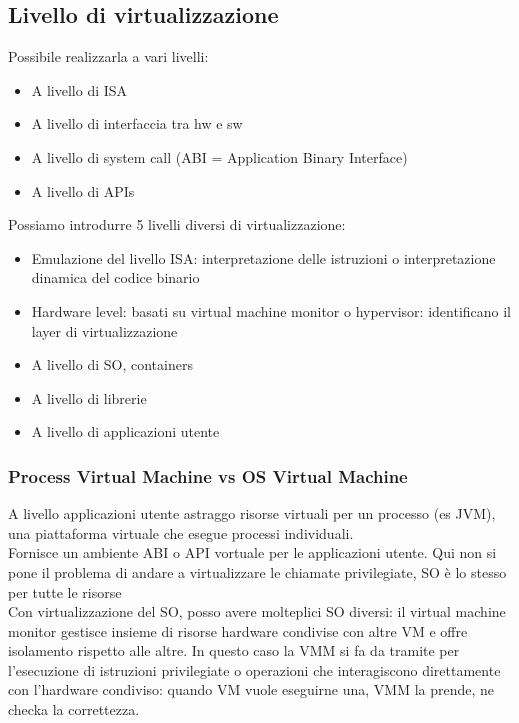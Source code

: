 \documentclass[16px]{article}
\begin{document}
\subsection{Livello di virtualizzazione}
Possibile realizzarla a vari livelli:
\begin{itemize}
\item A livello di ISA
\item A livello di interfaccia tra hw e sw
\item A livello di system call (ABI = Application Binary Interface)
\item A livello di APIs
\end{itemize}
Possiamo introdurre 5 livelli diversi di virtualizzazione:
\begin{itemize}
\item Emulazione del livello ISA: interpretazione delle istruzioni o interpretazione dinamica del codice binario
\item Hardware level: basati su virtual machine monitor o hypervisor: identificano il layer di virtualizzazione
\item A livello di SO, containers
\item A livello di librerie
\item A livello di applicazioni utente
\end{itemize}
\subsubsection{Process Virtual Machine vs OS Virtual Machine}
A livello applicazioni utente astraggo risorse virtuali per un processo (es JVM), una piattaforma virtuale che esegue processi individuali.\\ Fornisce un ambiente ABI o API vortuale per le applicazioni utente. Qui non si pone il problema di andare a virtualizzare le chiamate privilegiate, SO è lo stesso per tutte le risorse\\ Con virtualizzazione del SO, posso avere molteplici SO diversi: il virtual machine monitor gestisce insieme di risorse hardware condivise con altre VM e offre isolamento rispetto alle altre. In questo caso la VMM si fa da tramite per l'esecuzione di istruzioni privilegiate o operazioni che interagiscono direttamente con l'hardware condiviso: quando VM vuole eseguirne una, VMM la prende, ne checka la correttezza.
\end{document}
